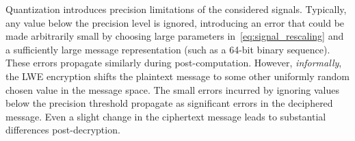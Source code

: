 \documentclass[journal, twoside, web]{ieeecolorpreprint}
\begin{document}
Quantization introduces precision limitations of the considered signals. Typically, any value below the precision level is ignored, introducing an error that could be made arbitrarily small by choosing large parameters in~\eqref{eq:signal_rescaling} and a sufficiently large message representation (such as a 64-bit binary sequence). These errors propagate similarly during post-computation. However, \emph{informally}, the LWE encryption shifts the plaintext message to some other uniformly random chosen value in the message space. The small errors incurred by ignoring values below the precision threshold propagate as significant errors in the deciphered message. Even a slight change in the ciphertext message leads to substantial differences post-decryption.


    


\end{document}
